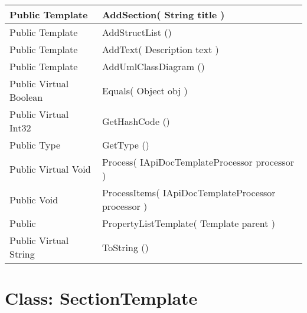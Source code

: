 \documentclass[11pt, oneside, a4paper]{book}
\begin{document}
\begin{center}
\begin{tabular}{| p{3cm} | p{12cm} | }
\hline
 Public  Template &  AddSection(\hypertarget{SoftwareEngineeringTools.{}Documentation.{}PropertyListTemplate.{}AddSection\_String}{} String  title  )\\
\hline
 Public  Template &  AddStructList ()\hypertarget{SoftwareEngineeringTools.{}Documentation.{}PropertyListTemplate.{}AddStructList}{}\\
\hline
 Public  Template &  AddText(\hypertarget{SoftwareEngineeringTools.{}Documentation.{}PropertyListTemplate.{}AddText\_Description}{} Description  text  )\\
\hline
 Public  Template &  AddUmlClassDiagram ()\hypertarget{SoftwareEngineeringTools.{}Documentation.{}PropertyListTemplate.{}AddUmlClassDiagram}{}\\
\hline
 Public  Virtual  Boolean &  Equals(\hypertarget{SoftwareEngineeringTools.{}Documentation.{}PropertyListTemplate.{}Equals\_Object}{} Object  obj  )\\
\hline
 Public  Virtual  Int32 &  GetHashCode ()\hypertarget{SoftwareEngineeringTools.{}Documentation.{}PropertyListTemplate.{}GetHashCode}{}\\
\hline
 Public  Type &  GetType ()\hypertarget{SoftwareEngineeringTools.{}Documentation.{}PropertyListTemplate.{}GetType}{}\\
\hline
 Public  Virtual  Void &  Process(\hypertarget{SoftwareEngineeringTools.{}Documentation.{}PropertyListTemplate.{}Process\_IApiDocTemplateProcessor}{} IApiDocTemplateProcessor  processor  )\\
\hline
 Public  Void &  ProcessItems(\hypertarget{SoftwareEngineeringTools.{}Documentation.{}PropertyListTemplate.{}ProcessItems\_IApiDocTemplateProcessor}{} IApiDocTemplateProcessor  processor  )\\
\hline
 Public  &  PropertyListTemplate(\hypertarget{SoftwareEngineeringTools.{}Documentation.{}PropertyListTemplate.{}PropertyListTemplate\_Template}{} Template  parent  )\\
\hline
 Public  Virtual  String &  ToString ()\hypertarget{SoftwareEngineeringTools.{}Documentation.{}PropertyListTemplate.{}ToString}{}\\
\hline
\end{tabular}
\end{center}
 


\hypertarget{SoftwareEngineeringTools.{}Documentation.{}SectionTemplate}{}
\section{Class: SectionTemplate}
\end{document}
